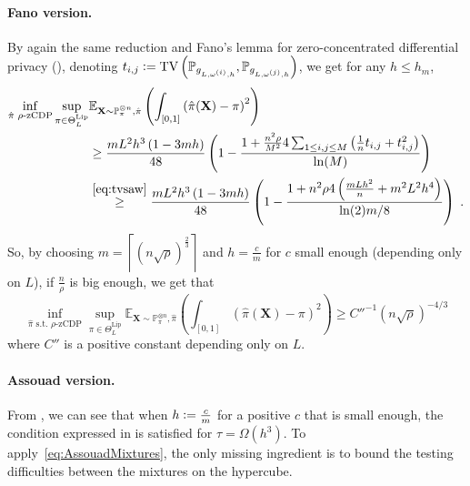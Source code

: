 \documentclass[10pt]{article} %
\newcommand{\Prob}[0]{\mathbb{P}}
\newcommand{\E}[0]{\mathbb{E}}
\newcommand{\eqdef}{\vcentcolon=}
\newcommand\vect[1]{\mathbf{#1}}
\newcommand\tv[2]{\mathrm{TV}\left( {#1}, {#2} \right)}
\newcommand\p[1]{\left( {#1}\right)}
\newcommand\ceil[1]{\left\lceil {#1}\right\rceil}
\begin{document}
\paragraph{Fano version.}
By again the same reduction and Fano's lemma for zero-concentrated differential privacy (), denoting $t_{i, j} \eqdef \tv{\Prob_{g_{L, \omega^{(i)}, h}}}{\Prob_{g_{L, \omega^{(j)}, h}}}$, we get for any $h \leq h_m$,
\begin{equation*}
    \begin{aligned}
    \inf_{\hat{\pi} \text{ $\rho$-zCDP}} \sup_{\pi \in \Theta^{\text{Lip}}_L}
    &\E_{\vect{X} \sim \Prob_{\pi}^{\otimes n}, \hat{\pi}}\p{ \int_{[0, 1]}\p{\hat{\pi}(\vect{X})- \pi}^2} \\
    &\geq 
    \frac{mL^2h^3\p{1 - 3 mh}}{48}
    \p{1 - \frac{1 + \frac{n^2 \rho}{M^2} 4 \sum_{1\leq i, j \leq M} \p{\frac{1}{n} t_{i, j} + t_{i, j}^2}}{\ln (M)}}  \\
    &\stackrel{\eqref{eq:tvsaw}}{\geq }
    \frac{mL^2h^3\p{1 - 3 mh}}{48}
    \p{1 - \frac{1 + n^2 \rho 4 \p{\frac{mLh^2}{n} + m^2 L^2 h^4}}{\ln (2) m / 8}} 
     \;.
    \end{aligned}
\end{equation*}
So, by choosing $m = \ceil{\p{n \sqrt{\rho}}^{
\frac{2}{3}}}$ and $h = \frac{c}{m} $ for $c$ small enough (depending only on $L$), if $\frac{n}{\rho}$ is big enough, we get that 
\begin{equation*}
    \inf_{\hat{\pi} \text{ s.t. } \text{$\rho$-zCDP}} \sup_{\pi \in \Theta^{\text{Lip}}_L}
    \E_{\vect{X} \sim \Prob_{\pi}^{\otimes n}, \hat{\pi}}\p{ \int_{[0, 1]}\p{\hat{\pi}(\vect{X})- \pi}^2} \geq C''^{-1} (n \sqrt{\rho})^{-4/3}
\end{equation*}
where $C''$ is a positive constant depending only on $L$.

\paragraph{Assouad version.}

From , we can see that when $h \eqdef \frac{c}{m}$ for a positive $c$ that is small enough, the condition expressed in  is satisfied for $\tau = \Omega(h^{3})$. To apply~\eqref{eq:AssouadMixtures}, the only missing ingredient is to bound the testing difficulties between the mixtures on the hypercube.
\end{document}
